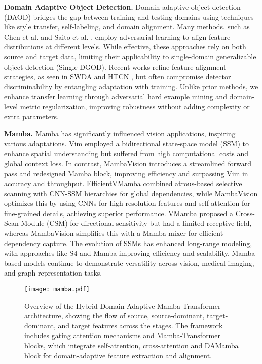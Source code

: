 \textbf{Domain Adaptive Object Detection.} Domain adaptive object detection (DAOD) bridges the gap between training and testing domains using techniques like style transfer, self-labeling, and domain alignment. Many methods, such as Chen et al. \cite{chen2018domain} and Saito et al. \cite{saito2019strong}, employ adversarial learning to align feature distributions at different levels. While effective, these approaches rely on both source and target data, limiting their applicability to single-domain generalizable object detection (Single-DGOD). Recent works refine feature alignment strategies, as seen in SWDA \cite{saito2019strong} and HTCN \cite{chen2020harmonizing}, but often compromise detector discriminability by entangling adaptation with training. Unlike prior methods, we enhance transfer learning through adversarial hard example mining and domain-level metric regularization, improving robustness without adding complexity or extra parameters.

\textbf{Mamba.} Mamba has significantly influenced vision applications, inspiring various adaptations. Vim \cite{zhu2024vision} employed a bidirectional state-space model (SSM) to enhance spatial understanding but suffered from high computational costs and global context loss. In contrast, MambaVision introduces a streamlined forward pass and redesigned Mamba block, improving efficiency and surpassing Vim in accuracy and throughput. EfficientVMamba \cite{pei2024efficientvmamba} combined atrous-based selective scanning with CNN-SSM hierarchies for global dependencies, while MambaVision optimizes this by using CNNs for high-resolution features and self-attention for fine-grained details, achieving superior performance. VMamba \cite{zhu2024vision} proposed a Cross-Scan Module (CSM) for directional sensitivity but had a limited receptive field, whereas MambaVision simplifies this with a Mamba mixer for efficient dependency capture. The evolution of SSMs \cite{gu2021efficiently, gu2023mamba} has enhanced long-range modeling, with approaches like S4 \cite{gu2021efficiently} and Mamba \cite{gu2023mamba} improving efficiency and scalability. Mamba-based models continue to demonstrate versatility across vision, medical imaging, and graph representation tasks.


\begin{figure*}[!t]
\centering
\texttt{[image: mamba.pdf]}
\caption{Overview of the Hybrid Domain-Adaptive Mamba-Transformer architecture, showing the flow of source, source-dominant, target-dominant, and target features across the stages. The framework includes gating attention mechanisms and Mamba-Transformer blocks, which integrate self-attention, cross-attention and DAMamba block for domain-adaptive feature extraction and alignment.}
\label{fig:mamba}
\end{figure*}